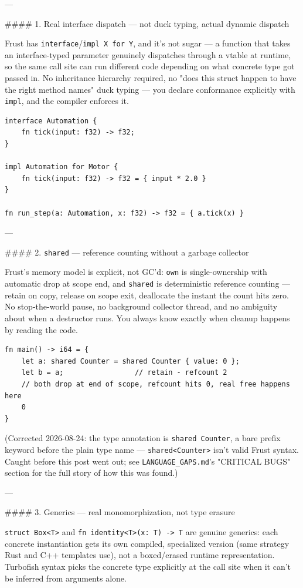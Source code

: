 \documentclass{book}
\begin{document}
---

#### 1. Real interface dispatch — not duck typing, actual dynamic dispatch

Frust has \texttt{interface}/\texttt{impl X for Y}, and it's not sugar — a function that takes an
interface-typed parameter genuinely dispatches through a vtable at runtime, so the same
call site can run different code depending on what concrete type got passed in. No
inheritance hierarchy required, no "does this struct happen to have the right method
names" duck typing — you declare conformance explicitly with \texttt{impl}, and the compiler
enforces it.

\begin{lstlisting}
interface Automation {
    fn tick(input: f32) -> f32;
}

impl Automation for Motor {
    fn tick(input: f32) -> f32 = { input * 2.0 }
}

fn run_step(a: Automation, x: f32) -> f32 = { a.tick(x) }
\end{lstlisting}

---

#### 2. \texttt{shared} — reference counting without a garbage collector

Frust's memory model is explicit, not GC'd: \texttt{own} is single-ownership with automatic
drop at scope end, and \texttt{shared} is deterministic reference counting — retain on
copy, release on scope exit, deallocate the instant the count hits zero. No
stop-the-world pause, no background collector thread, and no ambiguity about when a
destructor runs. You always know exactly when cleanup happens by reading the code.

\begin{lstlisting}
fn main() -> i64 = {
    let a: shared Counter = shared Counter { value: 0 };
    let b = a;                 // retain - refcount 2
    // both drop at end of scope, refcount hits 0, real free happens here
    0
}
\end{lstlisting}

(Corrected 2026-08-24: the type annotation is \texttt{shared Counter}, a bare
prefix keyword before the plain type name — \texttt{shared<Counter>} isn't
valid Frust syntax. Caught before this post went out; see
\texttt{LANGUAGE_GAPS.md}'s "CRITICAL BUGS" section for the full story of how
this was found.)

---

#### 3. Generics — real monomorphization, not type erasure

\texttt{struct Box<T>} and \texttt{fn identity<T>(x: T) -> T} are genuine generics: each concrete
instantiation gets its own compiled, specialized version (same strategy Rust and C++
templates use), not a boxed/erased runtime representation. Turbofish syntax picks the
concrete type explicitly at the call site when it can't be inferred from arguments
alone.
\end{document}
